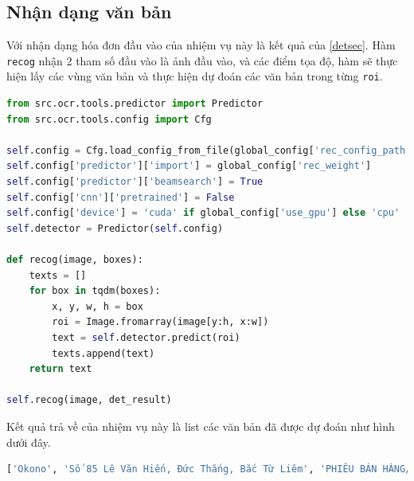 \subsection{Nhận dạng văn bản}
Với nhận dạng hóa đơn đầu vào của nhiệm vụ này là kết quả của \ref{detsec}. Hàm \texttt{recog} nhận 2 tham số đầu vào là ảnh đầu vào, và các điểm tọa độ, hàm sẽ thực hiện lấy các vùng văn bản và thực hiện dự đoán các văn bản trong từng \texttt{roi}.
\begin{lstlisting}[language=Python]
from src.ocr.tools.predictor import Predictor
from src.ocr.tools.config import Cfg

self.config = Cfg.load_config_from_file(global_config['rec_config_path'])
self.config['predictor']['import'] = global_config['rec_weight']
self.config['predictor']['beamsearch'] = True
self.config['cnn']['pretrained'] = False
self.config['device'] = 'cuda' if global_config['use_gpu'] else 'cpu'
self.detector = Predictor(self.config)

def recog(image, boxes):
    texts = []
    for box in tqdm(boxes):
        x, y, w, h = box
        roi = Image.fromarray(image[y:h, x:w])
        text = self.detector.predict(roi)
        texts.append(text)
    return text

self.recog(image, det_result)

\end{lstlisting}

Kết quả trả về của nhiệm vụ này là list các văn bản đã được dự đoán như hình dưới đây.
\begin{lstlisting}[language=Python]
['Okono', 'Số 85 Lê Văn Hiến, Đức Thắng, Bắc Từ Liêm', 'PHIÊU BÁN HÀNG/ INVOICE', 'Số:A3 1AA145550Ngày:18/05/2023 7:51:19PM', ...]
\end{lstlisting}
